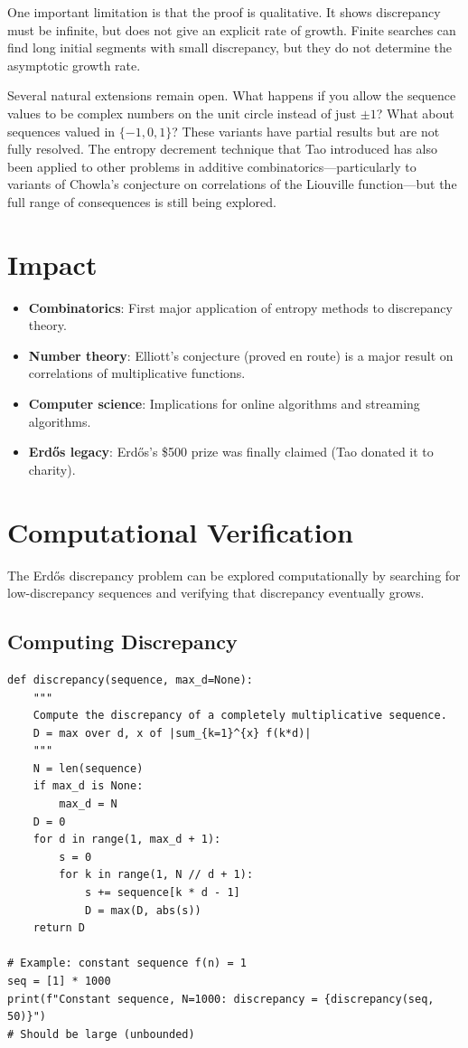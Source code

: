 One important limitation is that the proof is qualitative. It shows discrepancy must be infinite, but does not give an explicit rate of growth. Finite searches can find long initial segments with small discrepancy, but they do not determine the asymptotic growth rate.

Several natural extensions remain open. What happens if you allow the sequence values to be complex numbers on the unit circle instead of just $\pm 1$? What about sequences valued in $\{-1, 0, 1\}$? These variants have partial results but are not fully resolved. The entropy decrement technique that Tao introduced has also been applied to other problems in additive combinatorics---particularly to variants of Chowla's conjecture on correlations of the Liouville function---but the full range of consequences is still being explored.

\section{Impact}
\begin{itemize}
\item \textbf{Combinatorics}: First major application of entropy methods to discrepancy theory.
\item \textbf{Number theory}: Elliott's conjecture (proved en route) is a major result on correlations of multiplicative functions.
\item \textbf{Computer science}: Implications for online algorithms and streaming algorithms.
\item \textbf{Erdős legacy}: Erdős's \$500 prize was finally claimed (Tao donated it to charity).
\end{itemize}

\section{Computational Verification}

The Erd\H{o}s discrepancy problem can be explored computationally by searching for low-discrepancy sequences and verifying that discrepancy eventually grows.

\subsection{Computing Discrepancy}

\begin{verbatim}
def discrepancy(sequence, max_d=None):
    """
    Compute the discrepancy of a completely multiplicative sequence.
    D = max over d, x of |sum_{k=1}^{x} f(k*d)|
    """
    N = len(sequence)
    if max_d is None:
        max_d = N
    D = 0
    for d in range(1, max_d + 1):
        s = 0
        for k in range(1, N // d + 1):
            s += sequence[k * d - 1]
            D = max(D, abs(s))
    return D

# Example: constant sequence f(n) = 1
seq = [1] * 1000
print(f"Constant sequence, N=1000: discrepancy = {discrepancy(seq, 50)}")
# Should be large (unbounded)
\end{verbatim}

